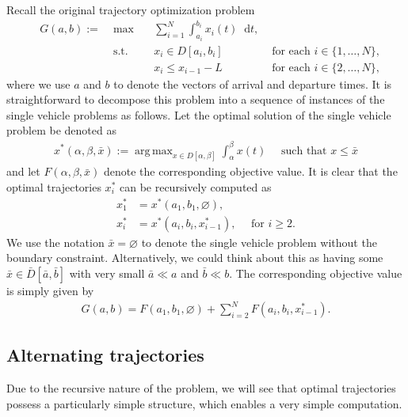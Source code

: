 \documentclass[a4paper]{article}
\theoremstyle{definition}
\theoremstyle{plain}
\DeclareMathOperator*{\argmax}{arg\,max}
\newcommand*\diff{\mathop{}\!\mathrm{d}}
\begin{document}
Recall the original trajectory optimization problem
\begin{subequations}
\begin{alignat}{3}
  &G(a,b) := \; &\max        \quad  & \sum_{i=1}^{N} \int_{a_{i}}^{b_{i}} x_{i}(t) \diff t , \\
  &             &\text{s.t.} \quad
  & x_{i} \in D[a_{i},b_{i}] & \text{ for each } i \in \{1, \dots, N\} , \\
  &&& x_{i} \leq x_{i-1} - L & \text{ for each } i \in \{2, \dots, N\} ,
\end{alignat}
\end{subequations}
where we use $a$ and $b$ to denote the vectors of arrival and departure times.
It is straightforward to decompose this problem into a sequence of instances of
the single vehicle problems as follows. Let the optimal solution of the single
vehicle problem be denoted as
\begin{align}
  x^{*}(\alpha, \beta, \bar{x}) := \argmax_{x \in D[\alpha,\beta]} \int_{\alpha}^{\beta} x(t) \quad \text{ such that  } x \leq \bar{x}
\end{align}
and let $F(\alpha, \beta, \bar{x})$ denote the corresponding objective value. It
is clear that the optimal trajectories $x^{*}_{i}$ can be recursively computed
as
\begin{subequations}
\begin{align}
  x^{*}_{1} &= x^{*}(a_{1}, b_{1}, \varnothing) , \\
  x^{*}_{i} &= x^{*}(a_{i}, b_{i}, x^{*}_{i-1})  ,  \quad \text{ for } i \geq 2 .
\end{align}
\end{subequations}
We use the notation $\bar{x} = \varnothing$ to denote the single vehicle problem
without the boundary constraint. Alternatively, we could think about this as
having some $\bar{x} \in \bar{D}[\bar{a},\bar{b}]$ with very small
$\bar{a} \ll a$ and $\bar{b} \ll b$.
%
The corresponding objective value is simply given by
\begin{align}
  G(a, b) = F(a_{1}, b_{1}, \varnothing) + \sum_{i=2}^{N} F(a_{i}, b_{i}, x^{*}_{i-1}) .
\end{align}

\subsection{Alternating trajectories}

Due to the recursive nature of the problem, we will see that optimal
trajectories possess a particularly simple structure, which enables a very
simple computation.
\end{document}
